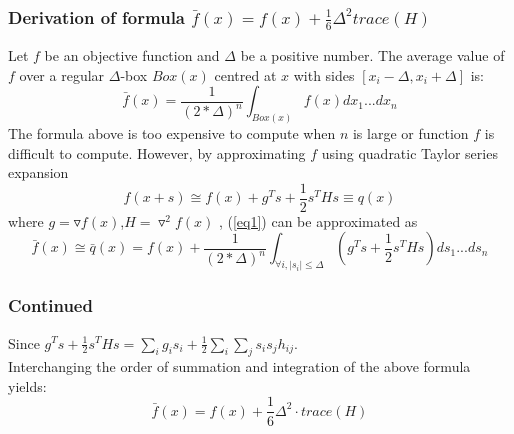 \documentclass[hyperref={pdfpagelabels=false}]{beamer}
\begin{document}

\begin{frame}
\frametitle{Derivation of formula $\bar{f}(x)=f(x)+\frac{1}{6}\Delta^2trace(H)$}
Let $f$ be an objective function and $\Delta$ be a positive number. The average value of $f$ over a regular
$\Delta$-box $Box(x)$ centred at $x$ with sides $[x_i-\Delta ,x_i+\Delta ]$ is:
\begin{equation}\label{eq1}
\bar{f}(x)=\frac{1}{(2\ast\Delta)^n}\int_{Box(x)}f(x)dx_1...dx_n
\end{equation}
The formula above is too expensive to compute when $n$ is large or function $f$ is difficult to
compute. However, by approximating $f$ using quadratic Taylor series expansion
\begin{equation}
f(x+s)\cong f(x)+g^Ts+\frac{1}{2}s^THs\equiv q(x)
\end{equation}
where $g=\triangledown f(x)$,$H=\triangledown^2f(x)$ , (\ref{eq1}) can be approximated as
\begin{equation}
\bar{f}(x)\cong \bar{q}(x)=f(x)+\frac{1}{(2\ast\Delta)^n}\int_{\forall i,|s_i|\leq\Delta}(g^Ts+\frac{1}{2}s^THs)ds_1...ds_n
\end{equation}
\end{frame}


\begin{frame}
\frametitle{Continued}
Since $g^Ts+\frac{1}{2}s^THs=\sum_ig_is_i+\frac{1}{2}\sum_i\sum_js_is_jh_{ij}$. \\
Interchanging the order of summation and integration of the above formula yields:
\begin{equation}
\bar{f}(x)=f(x)+\frac{1}{6}\Delta^2\cdot trace(H)
\end{equation}
\end{frame}

\end{document}
